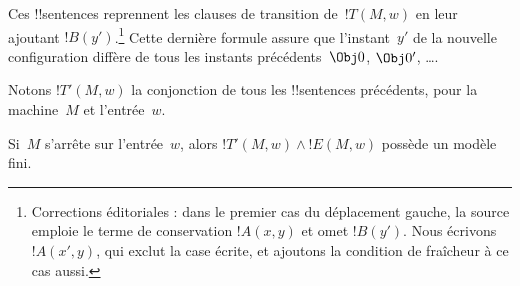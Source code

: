 \documentclass[../../../include/open-logic-section]{subfiles}
\begin{document}
\begin{enumerate}
Ces !!{sentence}s reprennent les clauses de transition de~$!T(M,w)$
en leur ajoutant $!B(y')$.\footnote{Corrections éditoriales : dans le premier cas du déplacement gauche, la source emploie le terme de conservation $!A(x,y)$ et omet $!B(y')$. Nous écrivons $!A(x',y)$, qui exclut la case écrite, et ajoutons la condition de fraîcheur à ce cas aussi.} Cette dernière formule assure que
l'instant~$y'$ de la nouvelle configuration diffère de tous les
instants précédents~$\Obj 0$, $\Obj 0'$, \dots{}.
\end{enumerate}
Notons $!T'(M,w)$ la conjonction de tous les !!{sentence}s
précédents, pour la machine~$M$ et l'entrée~$w$.

\begin{lem}
Si~$M$ s'arrête sur l'entrée~$w$, alors
$!T'(M,w)\land !E(M,w)$ possède un modèle fini.
\end{lem}
\end{document}
